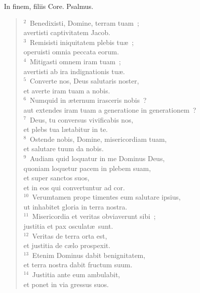 \lettrine[lines=3,image=true,loversize=0.05,lraise=-0.03]{I}{}n finem, filiis Core. Psalmus.
\begin{flushleft}\begin{verse}\vspace{6pt}${}^{2}$~Benedixisti, Domine, terram tuam~;\\ avertisti captivitatem Jacob.\\
${}^{3}$~Remisisti iniquitatem plebis tu\ae~;\\ operuisti omnia peccata eorum.\\
${}^{4}$~Mitigasti omnem iram tuam~;\\ avertisti ab ira indignationis tu\ae .\\
${}^{5}$~Converte nos, Deus salutaris noster,\\ et averte iram tuam a nobis.\\
${}^{6}$~Numquid in \ae ternum irasceris nobis~?\\ aut extendes iram tuam a generatione in generationem~?\\
${}^{7}$~Deus, tu conversus vivificabis nos,\\ et plebs tua l\ae tabitur in te.\\
${}^{8}$~Ostende nobis, Domine, misericordiam tuam,\\ et salutare tuum da nobis.\\
${}^{9}$~Audiam quid loquatur in me Dominus Deus,\\ quoniam loquetur pacem in plebem suam,\\ et super sanctos suos,\\ et in eos qui convertuntur ad cor.\\
${}^{10}$~Verumtamen prope timentes eum salutare ipsius,\\ ut inhabitet gloria in terra nostra.\\
${}^{11}$~Misericordia et veritas obviaverunt sibi~;\\ justitia et pax osculat\ae\ sunt.\\
${}^{12}$~Veritas de terra orta est,\\ et justitia de c\ae lo prospexit.\\
${}^{13}$~Etenim Dominus dabit benignitatem,\\ et terra nostra dabit fructum suum.\\
${}^{14}$~Justitia ante eum ambulabit,\\ et ponet in via gressus suos.\end{verse}\end{flushleft}



